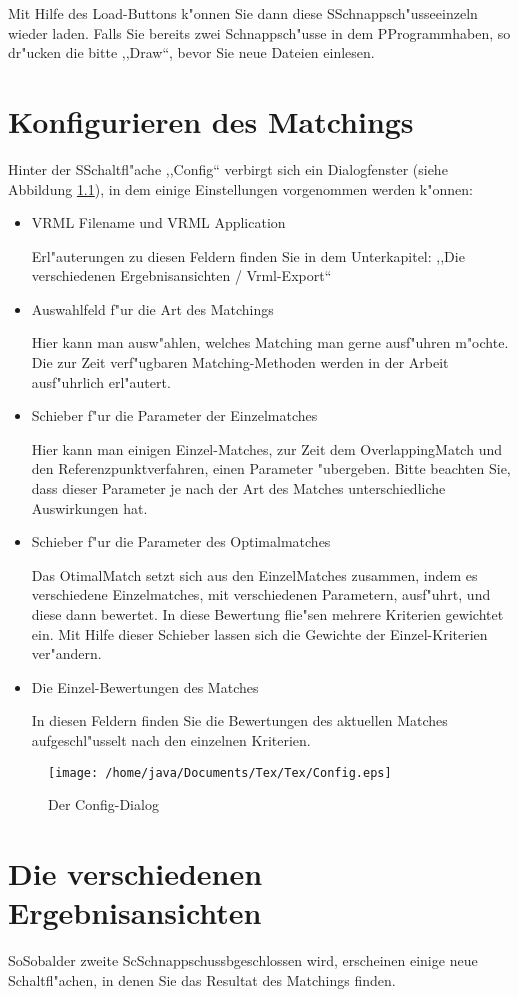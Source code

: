 \documentclass[a4paper,10pt,twoside]{scrreprt}
\begin{document}
Mit Hilfe des Load-Buttons k"onnen Sie dann diese SSchnappsch"usseeinzeln wieder laden. Falls Sie bereits zwei Schnappsch"usse in dem PProgrammhaben, so dr"ucken die bitte ,,Draw``, bevor Sie neue Dateien einlesen.
\chapter{Konfigurieren des Matchings}
Hinter der SSchaltfl"ache ,,Config`` verbirgt sich ein Dialogfenster (siehe Abbildung \ref{fig:Config}), in dem einige Einstellungen vorgenommen werden k"onnen:
\begin{itemize}
\item VRML Filename und VRML Application

Erl"auterungen zu diesen Feldern finden Sie in dem Unterkapitel: ,,Die verschiedenen Ergebnisansichten / Vrml-Export``
\item Auswahlfeld f"ur die Art des Matchings

Hier kann man ausw"ahlen, welches Matching man gerne ausf"uhren m"ochte. Die zur Zeit verf"ugbaren Matching-Methoden werden in der Arbeit ausf"uhrlich erl"autert.
\item Schieber f"ur die Parameter der Einzelmatches

Hier kann man einigen Einzel-Matches, zur Zeit dem OverlappingMatch und den Referenzpunktverfahren, einen Parameter "ubergeben. Bitte beachten Sie, dass dieser Parameter je nach der Art des Matches unterschiedliche Auswirkungen hat.
\item Schieber f"ur die Parameter des Optimalmatches

Das OtimalMatch setzt sich aus den EinzelMatches zusammen, indem es verschiedene Einzelmatches, mit verschiedenen Parametern, ausf"uhrt, und diese dann bewertet. In diese Bewertung flie"sen mehrere Kriterien gewichtet ein. Mit Hilfe dieser Schieber lassen sich die Gewichte der Einzel-Kriterien ver"andern.
\item Die Einzel-Bewertungen des Matches

In diesen Feldern finden Sie die Bewertungen des aktuellen Matches aufgeschl"usselt nach den einzelnen Kriterien.
\end{itemize} 
\begin{figure}
   \centering
   \texttt{[image: /home/java/Documents/Tex/Tex/Config.eps]}
   \caption{Der Config-Dialog}
   \label{fig:Config}
\end{figure}
\chapter{Die verschiedenen Ergebnisansichten}
SoSobalder zweite ScSchnappschussbgeschlossen wird, erscheinen einige neue Schaltfl"achen, in denen Sie das Resultat des Matchings finden.
\end{document}
